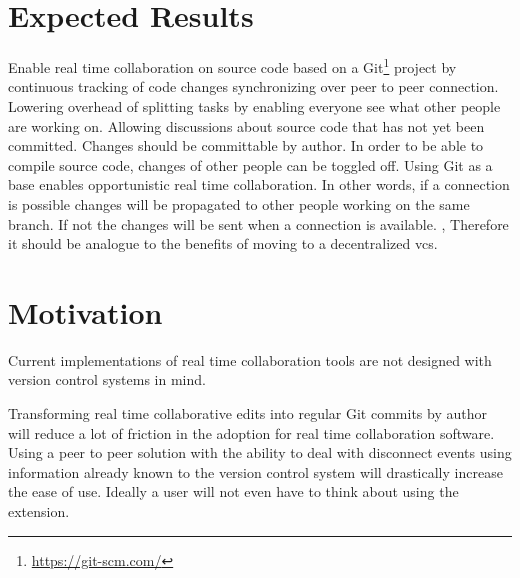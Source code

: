 \section{Expected Results}

Enable real time collaboration on source code based on a Git\footnote{\href{https://git-scm.com/}{https://git-scm.com/}} project by
continuous tracking of code changes synchronizing over peer to peer connection.
Lowering overhead of splitting tasks by enabling everyone see what other people are working on. Allowing discussions about source code that has not yet been committed.
Changes should be committable by author. In order to be able to compile source code, changes of other people can be toggled off.
Using Git as a base enables opportunistic real time collaboration. In other words, if a connection is possible changes will be propagated  to other people working on the same branch. If not the changes will be sent when a connection is available. \cite{AlwisSillito:2009:centralToDecentralVCS}, \cite{6188603} Therefore it should be analogue to the benefits of moving to a decentralized vcs.

\section{Motivation}

Current implementations of real time collaboration tools are not designed with version control systems in mind.

Transforming real time collaborative edits into regular Git commits by author will reduce a lot of friction in the adoption for real time collaboration software. Using a peer to peer solution with the ability to deal with disconnect events using information already known to the version control system will drastically increase the ease of use. Ideally a user will not even have to think about using the extension.